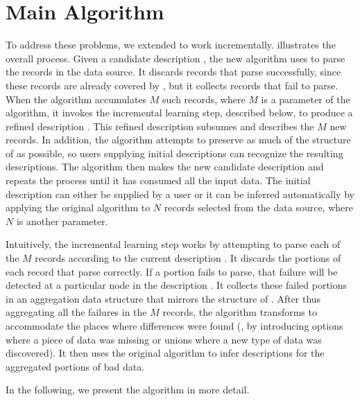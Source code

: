 \section{Main Algorithm}\label{sec:algo}

To address these problems, we extended \learnpads{} to work
incrementally.  
 illustrates the overall process.
Given a candidate description , the new algorithm uses  to parse
the records in the data source.  
It discards records that parse successfully, since these records are
already covered by , but it collects records that fail to parse.
When the algorithm accumulates $M$ such records, where $M$ is a
parameter of the algorithm, it invokes the incremental learning step,
described below, to produce a refined description .  This refined
description subsumes  and describes the $M$
new records.  In addition, the algorithm attempts to preserve as much
of the structure of  as possible, so users supplying initial
descriptions can recognize the resulting descriptions. 
The algorithm then makes 
the new candidate description and repeats the process until it
has consumed all the input data.
The initial description  can either be supplied by a user or it
can be inferred automatically by applying the original algorithm to
$N$ records selected from the data source, where $N$ is another
parameter.  


Intuitively, the incremental learning step works by attempting to
parse each of the $M$ records according to the current description
.  It discards the portions of each record that parse correctly.
If a portion fails to parse, that failure will be detected at a
particular node in the description . It collects these failed
portions in an aggregation data structure  that mirrors the
structure of .  After thus aggregating all the failures in the $M$
records, the algorithm transforms  to accommodate the places where
differences were found (\ie, by introducing options where a piece of
data was missing or unions where a new type of data was discovered).
It then uses the original \learnpads{} algorithm to infer descriptions
for the aggregated portions of bad data. 

In the following, we present the algorithm in more detail.

